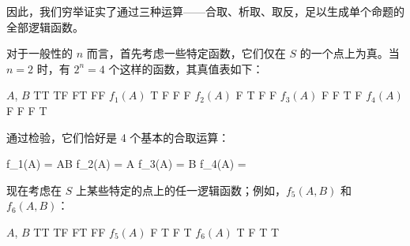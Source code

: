 因此，我们穷举证实了通过三种运算——合取、析取、取反，足以生成单个命题的全部逻辑函数。

对于一般性的 $n$ 而言，首先考虑一些特定函数，它们仅在 $S$ 的一个点上为真。当 $n = 2$ 时，有 $2^n = 4$ 个这样的函数，其真值表如下：

{\startxtable[offset=4pt]
  \startxtablehead[topframe=on, rulethickness=1.5pt]
  \startxrow
  \startxcell[width=2cm] $A$, $B$ \stopxcell
  \startxcell[width=2cm] TT \stopxcell
  \startxcell[width=2cm] TF \stopxcell
  \startxcell[width=2cm] FT \stopxcell
  \startxcell[width=2cm] FF \stopxcell
  \stopxrow
  \stopxtablehead
  \startxtablebody
  \startxrow[topframe=on,rulethickness=0.75pt]
  \startxcell $f_1(A)$ \stopxcell
  \startxcell T \stopxcell
  \startxcell F \stopxcell
  \startxcell F \stopxcell
  \startxcell F \stopxcell
  \stopxrow
  \startxrow
  \startxcell $f_2(A)$ \stopxcell
  \startxcell F \stopxcell
  \startxcell T \stopxcell
  \startxcell F \stopxcell
  \startxcell F \stopxcell
  \stopxrow
  \startxrow
  \startxcell $f_3(A)$ \stopxcell
  \startxcell F \stopxcell
  \startxcell F \stopxcell
  \startxcell T \stopxcell
  \startxcell F \stopxcell
  \stopxrow          
  \stopxtablebody
  \startxtablefoot[bottomframe=on,rulethickness=1.5pt]
  \startxrow
  \startxcell $f_4(A)$ \stopxcell
  \startxcell F \stopxcell
  \startxcell F \stopxcell
  \startxcell F \stopxcell
  \startxcell T \stopxcell
  \stopxrow
  \stopxtablefoot
  \stopxtable
}

通过检验，它们恰好是 4 个基本的合取运算：

\placeformula[1-17]
\startformula
\startalign
\NC f_1(A) \NC = AB\NR
\NC f_2(A) \NC = A\NR
\NC f_3(A) \NC = B\NR
\NC f_4(A) \NC = \NR
\stopalign
\stopformula

现在考虑在 $S$ 上某些特定的点上的任一逻辑函数；例如，$f_5(A, B)$ 和 $f_6(A, B)$：

{\startxtable[offset=4pt]
  \startxtablehead[topframe=on, rulethickness=1.5pt]
  \startxrow
  \startxcell[width=2cm] $A$, $B$ \stopxcell
  \startxcell[width=2cm] TT \stopxcell
  \startxcell[width=2cm] TF \stopxcell
  \startxcell[width=2cm] FT \stopxcell
  \startxcell[width=2cm] FF \stopxcell
  \stopxrow
  \stopxtablehead
  \startxtablebody
  \startxrow[topframe=on,rulethickness=0.75pt]
  \startxcell $f_5(A)$ \stopxcell
  \startxcell F \stopxcell
  \startxcell T \stopxcell
  \startxcell F \stopxcell
  \startxcell T \stopxcell
  \stopxrow
  \stopxtablebody
  \startxtablefoot[bottomframe=on,rulethickness=1.5pt]
  \startxrow
  \startxcell $f_6(A)$ \stopxcell
  \startxcell T \stopxcell
  \startxcell F \stopxcell
  \startxcell T \stopxcell
  \startxcell T \stopxcell
  \stopxrow
  \stopxtablefoot
  \stopxtable
}

